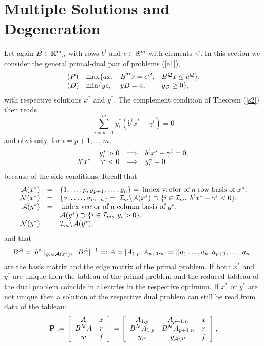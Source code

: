\section{Multiple Solutions and Degeneration}
Let again $B \in \Bbb{R}^m{}_n$ with rows $b^i$ and $c \in \Bbb{R}^m$ with
elements $\gamma ^i$. In this section we consider the general primal-dual pair
of problems (\ref{e1}),
%
\begin{equation} \label{ss1}
\ba{.}{llll}
(P) &\max \{ax, & B^{\P}x = c^{\P}, & B^{\Q}x \leq c^{\Q}\},\\
(D) &\min \{yc, & yB = a,           & y_{\Q} \geq 0\},
\ea{.}
\end{equation}
%
with respective solutions $x^*$ and $y^*$. The complement condition
of Theorem (\ref{s2}) then reads
%
\begin{equation} \label{ss2}
\sum_{i=p+1}^my^*_i(b^ix^* - \gamma ^i) = 0
\end{equation}
%
and obviously, for $i = p+1, \ldots,m$,
\[
\ba{.}{rcl}
y^*_i > 0 &\Longrightarrow& b^ix^* - \gamma ^i = 0,\\
b^ix^* - \gamma ^i < 0 &\Longrightarrow& y^*_i = 0
\ea{.}
\]
because of the side conditions. Recall that
\begin{equation} \label{ss10}
\ba{.}{rcll}
\A(x^*) &=& \{1,\ldots, p,\rho _{p+1}, \ldots,\rho _n\} = \;
\mbox{index vector of a row basis of $x^*$},\\
\N(x^*) &=& \{\sigma _1,\ldots, \sigma _{m-n}\} = \;
 \I_m \backslash \A(x^*) \supset \{i \in \I_m, \; b^ix^* - \gamma ^i
< 0\},\\
\A(y^*) &=& \; \mbox{index vector of a column basis of $y^*$}, \\
 &&\A(y^*) \supset \{i \in \I_m, \; y_i > 0\},\\
\N(y^*) &=& \I_m \backslash \A(y^*),
\ea{.}
\end{equation}
and that
\[
B^{\A} = [b^{\rho _i}]_{\rho _i\in \A(x^*)}, \;
[B^{\A}]^{-1} =: A = [A_{1:p}, A_{p+1:n}] = [[a_1\ldots,
a_p][a_{p+1},\ldots,a_n]]
\]
are the basis matrix and the edge matrix of the primal problem.  If both $x^*$
and $y^*$ are unique then the tableau of the primal problem and the reduced
tableau of the dual problem coincide in allentries in the respective optimum.
If $x^*$ or $y^*$ are not unique then a solution of the respective dual problem
can still be read from data of the tableau:
%
\begin{equation} \label{ss1a}
{\bf P} :=
\ba{[}{cc} A & x\\B^{\N}A & r\\w & f \ea{]}
%
= \ba{[}{ccc} A_{1:p}        & A_{p+1:n}              & x\\
              B^{\N}A_{1:p}  & B^{\N}A_{p+1:n}        & r\\
                      y_{\P} & y_{\A \backslash \P}   & f
           \ea{]},
\end{equation}
